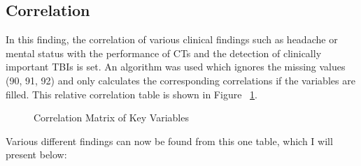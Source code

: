 \documentclass[10pt,letterpaper]{article}
\begin{document}
\subsection{Correlation}\label{second-finding}

In this finding, the correlation of various clinical findings such as headache or mental status with the performance of CTs and the detection of clinically important TBIs is set. An algorithm was used which ignores the missing values (90, 91, 92) and only calculates the corresponding correlations if the variables are filled. This relative correlation table is shown in Figure ~\ref{fig:correlation_matrix}.


\begin{figure}[H]
    \centering
    \caption{Correlation Matrix of Key Variables}
    \label{fig:correlation_matrix}
\end{figure}

Various different findings can now be found from this one table, which I will present below:
\end{document}
